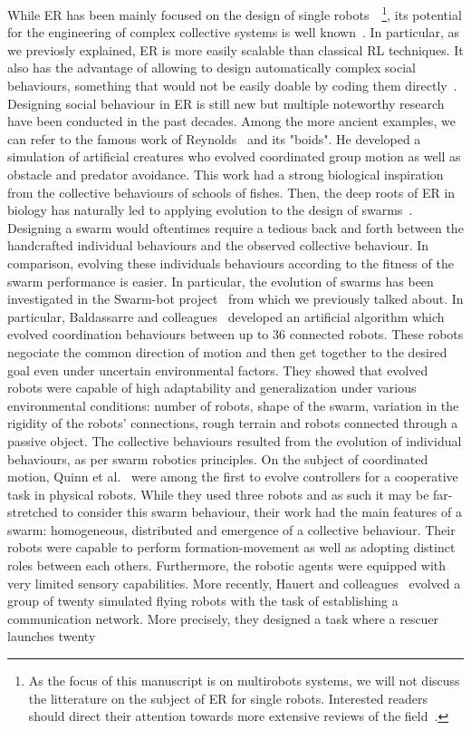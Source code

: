   While ER has been mainly focused on the design of single robots~\parencite{Doncieux2015a}~\footnote{As the focus of this manuscript is on multirobots systems, we will not discuss the litterature on the subject of ER for single robots. Interested readers should direct their attention towards more extensive reviews of the field~\parencite{Floreano2008, Bongard2013a, Trianni2014, Doncieux2015a}.}, its potential for the engineering of complex collective systems is well known~\parencite{Baldassarre2003}. In particular, as we previosly explained, ER is more easily scalable than classical RL techniques. It also has the advantage of allowing to design automatically complex social behaviours, something that would not be easily doable by coding them directly~\parencite{Baldassarre2003}. Designing social behaviour in ER is still new but multiple noteworthy research have been conducted in the past decades. Among the more ancient examples, we can refer to the famous work of Reynolds~\parencite{Reynolds1992} and its "boids". He developed a simulation of artificial creatures who evolved coordinated group motion as well as obstacle and predator avoidance. This work had a strong biological inspiration from the collective behaviours of schools of fishes. Then, the deep roots of ER in biology has naturally led to applying evolution to the design of swarms~\parencite{Brambilla2012, Francesca2016}. Designing a swarm would oftentimes require a tedious back and forth between the handcrafted individual behaviours and the observed collective behaviour. In comparison, evolving these individuals behaviours according to the fitness of the swarm performance is easier. In particular, the evolution of swarms has been investigated in the Swarm-bot project~\parencite{Mondada2005} from which we previously talked about. In particular, Baldassarre and colleagues~\parencite{Baldassarre2007} developed an artificial algorithm which evolved coordination behaviours between up to $36$ connected robots. These robots negociate the common direction of motion and then get together to the desired goal even under uncertain environmental factors. They showed that evolved robots were capable of high adaptability and generalization under various environmental conditions: number of robots, shape of the swarm, variation in the rigidity of the robots' connections, rough terrain and robots connected through a passive object. The collective behaviours resulted from the evolution of individual behaviours, as per swarm robotics principles. On the subject of coordinated motion, Quinn et al.~\parencite{Quinn2003} were among the first to evolve controllers for a cooperative task in physical robots. While they used three robots and as such it may be far-stretched to consider this swarm behaviour, their work had the main features of a swarm: homogeneous, distributed and emergence of a collective behaviour. Their robots were capable to perform formation-movement as well as adopting distinct roles between each others. Furthermore, the robotic agents were equipped with very limited sensory capabilities. More recently, Hauert and colleagues~\parencite{Hauert2014} evolved a group of twenty simulated flying robots with the task of establishing a communication network. More precisely, they designed a task where a rescuer launches twenty 